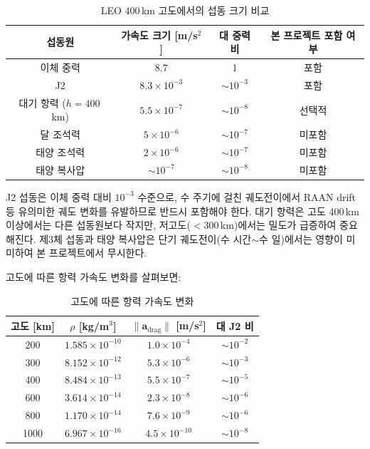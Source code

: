 \documentclass[11pt]{article}
\begin{document}
\begin{table}[h]
\centering
\caption{LEO 400\,km 고도에서의 섭동 크기 비교}
\label{tab:perturbation_comparison}
\begin{tabular}{cccc}
\toprule
섭동원 & 가속도 크기 [m/s$^2$] & 대 중력 비 & 본 프로젝트 포함 여부 \\
\midrule
이체 중력 & $8.7$ & 1 & 포함 \\
J2 & $8.3 \times 10^{-3}$ & $\sim 10^{-3}$ & 포함 \\
대기 항력 ($h=400$\,km) & $5.5 \times 10^{-7}$ & $\sim 10^{-8}$ & 선택적 \\
달 조석력 & $5 \times 10^{-6}$ & $\sim 10^{-7}$ & 미포함 \\
태양 조석력 & $2 \times 10^{-6}$ & $\sim 10^{-7}$ & 미포함 \\
태양 복사압 & $\sim 10^{-7}$ & $\sim 10^{-8}$ & 미포함 \\
\bottomrule
\end{tabular}
\end{table}

J2 섭동은 이체 중력 대비 $10^{-3}$ 수준으로, 수 주기에 걸친 궤도전이에서 RAAN drift 등 유의미한 궤도 변화를 유발하므로 반드시 포함해야 한다. 대기 항력은 고도 400\,km 이상에서는 다른 섭동원보다 작지만, 저고도($< 300$\,km)에서는 밀도가 급증하여 중요해진다. 제3체 섭동과 태양 복사압은 단기 궤도전이(수 시간$\sim$수 일)에서는 영향이 미미하여 본 프로젝트에서 무시한다.

고도에 따른 항력 가속도 변화를 살펴보면:

\begin{table}[h]
\centering
\caption{고도에 따른 항력 가속도 변화}
\label{tab:drag_vs_altitude}
\begin{tabular}{cccc}
\toprule
고도 [km] & $\rho$ [kg/m$^3$] & $\|\mathbf{a}_{\text{drag}}\|$ [m/s$^2$] & 대 J2 비 \\
\midrule
200 & $1.585 \times 10^{-10}$ & $1.0 \times 10^{-4}$ & $\sim 10^{-2}$ \\
300 & $8.152 \times 10^{-12}$ & $5.3 \times 10^{-6}$ & $\sim 10^{-3}$ \\
400 & $8.484 \times 10^{-13}$ & $5.5 \times 10^{-7}$ & $\sim 10^{-5}$ \\
600 & $3.614 \times 10^{-14}$ & $2.3 \times 10^{-8}$ & $\sim 10^{-6}$ \\
800 & $1.170 \times 10^{-14}$ & $7.6 \times 10^{-9}$ & $\sim 10^{-6}$ \\
1000 & $6.967 \times 10^{-16}$ & $4.5 \times 10^{-10}$ & $\sim 10^{-8}$ \\
\bottomrule
\end{tabular}
\end{table}
\end{document}
